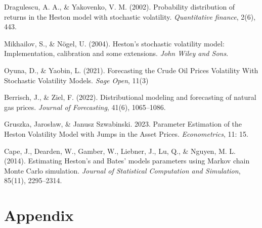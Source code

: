 \documentclass[12pt,a4paper]{article}
\numberwithin{equation}{section}
\begin{document}
\begin{thebibliography}{11}
\bibitem{}
Dragulescu, A. A., \& Yakovenko, V. M. (2002). Probability distribution of returns in the Heston model with stochastic volatility. \emph{Quantitative finance}, 2(6), 443.

\bibitem{}
Mikhailov, S., \& Nögel, U. (2004). Heston’s stochastic volatility model: Implementation, calibration and some extensions. \emph{John Wiley and Sons}.

\bibitem{}
Oyuna, D., \& Yaobin, L. (2021). Forecasting the Crude Oil Prices Volatility With Stochastic Volatility Models. \emph{Sage Open}, 11(3)

\bibitem{}
Berrisch, J., \& Ziel, F. (2022). Distributional modeling and forecasting of natural gas prices. \emph{Journal of Forecasting}, 41(6), 1065–1086. 


\bibitem{}
Gruszka, Jarosław, \& Janusz Szwabinski. 2023. Parameter Estimation of the Heston Volatility Model with Jumps in the Asset Prices. \emph{Econometrics}, 11: 15.

\bibitem{}
Cape, J., Dearden, W., Gamber, W., Liebner, J., Lu, Q., \& Nguyen, M. L. (2014). Estimating Heston’s and Bates’ models parameters using Markov chain Monte Carlo simulation. \emph{Journal of Statistical Computation and Simulation}, 85(11), 2295–2314. 





\end{thebibliography}
\newpage
\section*{Appendix}



 


%
%



\setcounter{equation}{0}
\renewcommand\theequation{\Alph{section}.\arabic{equation}}	
\setcounter{table}{0}
\renewcommand\thetable{\Alph{section}.\arabic{table}}
\setcounter{figure}{0}
\renewcommand\thefigure{\Alph{section}.\arabic{figure}}
\end{document}

